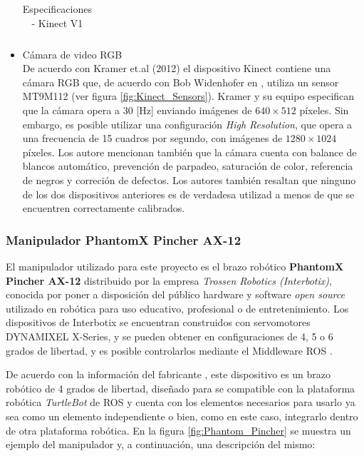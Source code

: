 \begin{itemize}
\begin{table}
\begin{tabular}{|c|c|}
                \hline
                \end{tabular}
                \caption{Especificaciones - Kinect V1}
                \label{tab:Kinect_especs}
            \end{table}

            \item Cámara de video RGB \\
            De acuerdo con Kramer et.al (2012) \cite{kramer_hacking_2012} el dispositivo Kinect contiene una cámara RGB que, de acuerdo con Bob Widenhofer en \cite{eetimes_inside_2010}, utiliza un sensor MT9M112 (ver figura \ref{fig:Kinect_Sensors}). Kramer y su equipo especifican que la cámara opera a 30 [Hz] enviando imágenes de $640\times512$ píxeles. Sin embargo, es posible utilizar una configuración \textit{High Resolution}, que opera a una frecuencia de 15 cuadros por segundo, con imágenes de $1280\times1024$ píxeles. Los autore mencionan también que la cámara cuenta con balance de blancos automático, prevención de parpadeo, saturación de color, referencia de negros y correción de defectos. Los autores también resaltan que ninguno de los dos dispositivos anteriores es de verdadesa utilizad a menos de que se encuentren correctamente calibrados. 
            \end{itemize}
            
            \subsubsection{Manipulador PhantomX Pincher AX-12}
            El manipulador utilizado para este proyecto es el brazo robótico \textbf{PhantomX Pincher AX-12} distribuido por la empresa \textit{Trossen Robotics (Interbotix)}, conocida por poner a disposición del público hardware y software \textit{open source} utilizado en robótica para uso educativo, profesional o de entretenimiento. Los dispositivos de Interbotix se encuentran construidos con servomotores DYNAMIXEL X-Series, y se pueden obtener en configuraciones de 4, 5 o 6 grados de libertad, y es posible controlarlos mediante el Middleware ROS \cite{Interbotix_interbotix}. 
            
            De acuerdo con la información del fabricante \cite{Interbotix_widowx_PincherArm}, este dispositivo es un brazo robótico de 4 grados de libertad, diseñado para se compatible con la plataforma robótica \textit{TurtleBot} de ROS y cuenta con los elementos necesarios para usarlo ya sea como un elemento independiente o bien, como en este caso, integrarlo dentro de otra plataforma robótica. En la figura \ref{fig:Phantom_Pincher} se muestra un ejemplo del manipulador y, a continuación, una descripción del mismo:
            \phantom{saltodelineaforzado >:D}\\
            

